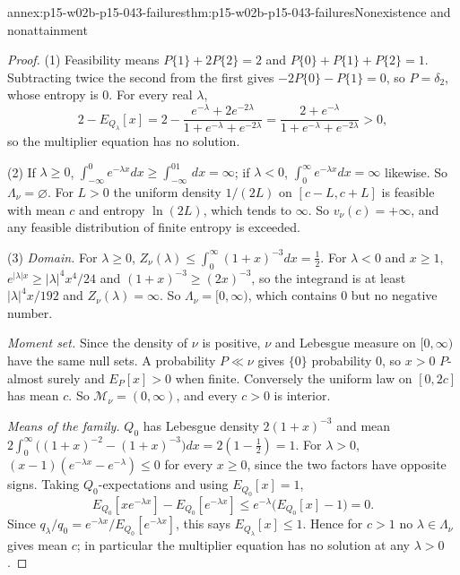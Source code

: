 \begin{annexitem}{annex:p15-w02b-p15-043-failures}{thm:p15-w02b-p15-043-failures}{Nonexistence and nonattainment}
\begin{proof}
(1) Feasibility means \(P\{1\}+2P\{2\}=2\) and \(P\{0\}+P\{1\}+P\{2\}=1\).
Subtracting twice the second from the first gives \(-2P\{0\}-P\{1\}=0\), so
\(P=\delta_2\), whose entropy is \(0\). For every real \(\lambda\),
\[
 2-E_{Q_\lambda}[x]=2-\frac{e^{-\lambda}+2e^{-2\lambda}}{1+e^{-\lambda}+e^{-2\lambda}}
 =\frac{2+e^{-\lambda}}{1+e^{-\lambda}+e^{-2\lambda}}>0 ,
\]
so the multiplier equation has no solution.

(2) If \(\lambda\geq0\), \(\int_{-\infty}^0e^{-\lambda x}dx\geq\int_{-\infty}^01\,dx=\infty\);
if \(\lambda<0\), \(\int_0^\infty e^{-\lambda x}dx=\infty\) likewise. So
\(\Lambda_\nu=\varnothing\). For \(L>0\) the uniform density \(1/(2L)\) on
\([c-L,c+L]\) is feasible with mean \(c\) and entropy \(\ln(2L)\), which tends to
\(\infty\). So \(v_\nu(c)=+\infty\), and any feasible distribution of finite
entropy is exceeded.

(3) \emph{Domain.} For \(\lambda\geq0\),
\(Z_\nu(\lambda)\leq\int_0^\infty(1+x)^{-3}dx=\tfrac12\). For \(\lambda<0\) and
\(x\geq1\), \(e^{|\lambda|x}\geq|\lambda|^4x^4/24\) and \((1+x)^{-3}\geq(2x)^{-3}\),
so the integrand is at least \(|\lambda|^4x/192\) and \(Z_\nu(\lambda)=\infty\).
So \(\Lambda_\nu=[0,\infty)\), which contains \(0\) but no negative number.

\emph{Moment set.} Since the density of \(\nu\) is positive, \(\nu\) and
Lebesgue measure on \([0,\infty)\) have the same null sets. A probability
\(P\ll\nu\) gives \(\{0\}\) probability \(0\), so \(x>0\) \(P\)-almost surely
and \(E_P[x]>0\) when finite. Conversely the uniform law on \([0,2c]\) has
mean \(c\). So \(\mathcal M_\nu=(0,\infty)\), and every \(c>0\) is interior.

\emph{Means of the family.} \(Q_0\) has Lebesgue density \(2(1+x)^{-3}\) and
mean \(2\int_0^\infty\bigl((1+x)^{-2}-(1+x)^{-3}\bigr)dx=2(1-\tfrac12)=1\).
For \(\lambda>0\), \((x-1)(e^{-\lambda x}-e^{-\lambda})\leq0\) for every
\(x\geq0\), since the two factors have opposite signs. Taking
\(Q_0\)-expectations and using \(E_{Q_0}[x]=1\),
\[
 E_{Q_0}[xe^{-\lambda x}]-E_{Q_0}[e^{-\lambda x}]\leq e^{-\lambda}\bigl(E_{Q_0}[x]-1\bigr)=0 .
\]
Since \(q_\lambda/q_0=e^{-\lambda x}/E_{Q_0}[e^{-\lambda x}]\), this says
\(E_{Q_\lambda}[x]\leq1\). Hence for \(c>1\) no \(\lambda\in\Lambda_\nu\) gives
mean \(c\); in particular the multiplier equation has no solution at any
\(\lambda>0\).


\end{proof}
\end{annexitem}
